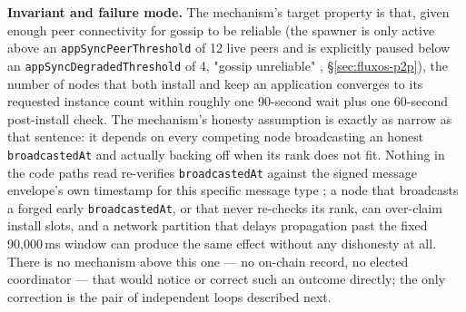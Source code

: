 \textbf{Invariant and failure mode.} The mechanism's target property is that, given enough peer
connectivity for gossip to be reliable (the spawner is only active above an
\texttt{app\allowbreak{}Sync\allowbreak{}Peer\allowbreak{}Threshold} of 12 live peers and is explicitly paused below an
\texttt{app\allowbreak{}Sync\allowbreak{}Degraded\allowbreak{}Threshold} of 4, "gossip unreliable"
, \S\ref{sec:fluxos-p2p}), the number of nodes
that both install and keep an application converges to its requested instance count within roughly
one 90-second wait plus one 60-second post-install check. The mechanism's honesty assumption is
exactly as narrow as that sentence: it depends on every competing node broadcasting an honest
\texttt{broadcastedAt} and actually backing off when its rank does not fit. Nothing in the code
paths read re-verifies \texttt{broadcastedAt} against the signed message envelope's own timestamp
for this specific message type \srcinferred; a node that broadcasts a forged early
\texttt{broadcastedAt}, or that never re-checks its rank, can over-claim install slots, and a
network partition that delays propagation past the fixed 90{,}000\,ms window can produce the same
effect without any dishonesty at all. There is no mechanism above this one — no on-chain record, no
elected coordinator — that would notice or correct such an outcome directly; the only correction is
the pair of independent loops described next.

